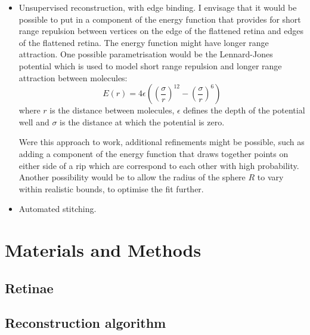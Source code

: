 \documentclass[10pt]{article}
\begin{document}
\begin{itemize}
\item Unsupervised reconstruction, with edge binding.  I envisage that
  it would be possible to put in a component of the energy function
  that provides for short range repulsion between vertices on the edge
  of the flattened retina and edges of the flattened retina. The
  energy function might have longer range attraction. One possible
  parametrisation would be the Lennard-Jones potential which is used
  to model short range repulsion and longer range attraction between
  molecules:
  \begin{equation}
    \label{fold-sphere:eq:4}
    E(r) = 4\epsilon\left(\left(\frac{\sigma}{r}\right)^{12}-
      \left(\frac{\sigma}{r}\right)^{6}\right)
  \end{equation}
  where $r$ is the distance between molecules, $\epsilon$ defines the
  depth of the potential well and $\sigma$ is the distance at which the
  potential is zero.

  Were this approach to work, additional refinements might be possible,
  such as adding a component of the energy function that draws together
  points on either side of a rip which are correspond to each other with
  high probability. Another possibility would be to allow the radius of
  the sphere $R$ to vary within realistic bounds, to optimise the fit
  further.
\item Automated stitching.
\end{itemize}


\section*{Materials and Methods}
\label{retistruct_plos:sec:materials-methods}

\subsection*{Retinae}
\label{retistruct_plos:sec:retinae}


\subsection*{Reconstruction algorithm}
\label{retistruct_plos:sec:reconstr-algor}
\end{document}
